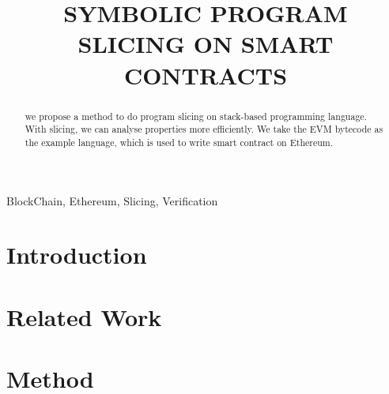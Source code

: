 \documentclass{article}
\title{SYMBOLIC PROGRAM SLICING ON SMART CONTRACTS}
\begin{document}
%

\maketitle

%

\begin{abstract}

  we propose a method to do program slicing on stack-based programming language. With slicing, we can analyse properties more efficiently. We take the EVM bytecode\cite{wood2014ethereum} as the example language, which is used to write smart contract\cite{szabo2003advances} on Ethereum\cite{wood2014ethereum}.

\end{abstract}

\begin{keywords}
  BlockChain, Ethereum, Slicing, Verification
\end{keywords}


\section{Introduction}
\label{sec:introduction}

\section{Related Work}
\label{sec:relatedwork}

\section{Method}
\label{sec:method}
\end{document}
